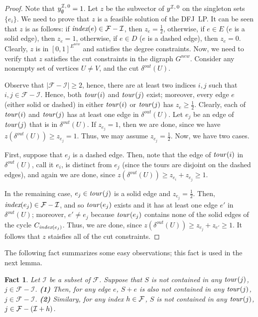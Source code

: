 \documentclass[11pt]{article}
\newtheorem{fact}[theorem]{Fact}
\newcommand{\fracset}{\mathcal{F}}
\newcommand{\sgn}{\mathcal{I}}
\begin{document}
\begin{proof}
Note that $\zvec{\sgn}{0}_{\emptyset}=1$.
Let $z$ be the subvector of $\zvec{\sgn}{0}$
on the singleton sets $\{e_i\}$.
We need to prove that $z$ is a feasible
solution of the DFJ~LP.
It can be seen that $z$ is as follows:
if $\cindex{e}\in\fracset-\sgn$, then $z_e=\frac12$,
otherwise, if $e\in E$ ($e$ is a solid edge), then $z_e=1$,
otherwise, if $e\in D$ ($e$ is a dashed edge), then $z_e=0$.
Clearly, $z$ is in $[0, 1]^{E^{new}}$ and satisfies the degree constraints.
Now, we need to verify that $z$ satisfies the cut constraints
in the digraph $G^{new}$.
Consider any nonempty set of vertices $U\not=V$, and the cut $\delta^{out}(U)$.

Observe that $|\fracset-\sgn| \ge2$, hence, there are at least two indices
$i,j$ such that $i,j\in \fracset-\sgn$.
Hence, both $\textit{tour\/}(i)$ and $\textit{tour\/}(j)$ exist;
moreover, every edge $e$ (either solid or dashed) in either
$\textit{tour\/}(i)$ or $\textit{tour\/}(j)$ has $z_e\ge\frac12$.
Clearly, each of $\textit{tour\/}(i)$ and $\textit{tour\/}(j)$ has
at least one edge in $\delta^{out}(U)$.
Let $e_j$ be an edge of $\textit{tour\/}(j)$ that is in $\delta^{out}(U)$.
If $z_{e_j}=1$, then we are done,
since we have $z(\delta^{out}(U))\ge z_{e_j}=1$.
Thus, we may assume $z_{e_j}=\frac12$.
Now, we have two cases.

First, suppose that $e_j$ is a dashed edge.
Then, note that the edge of $\textit{tour\/}(i)$ in $\delta^{out}(U)$,
call it $e_i$, is distinct from $e_j$
(since the tours are disjoint on the dashed edges),
and again we are done, since $z(\delta^{out}(U))\ge z_{e_i}+z_{e_j}\ge1$.

In the remaining case, $e_j\in\textit{tour\/}(j)$ is a solid edge
and $z_{e_j}=\frac12$.
Then, $\cindex{e_j}\in \fracset-\sgn$, and so 
$\textit{tour\/}(e_j)$
exists and it has at least one edge $e'$ in $\delta^{out}(U)$;
moreover, $e'\not=e_j$ because 
$\textit{tour\/}(e_j)$
contains none of the solid edges of the cycle $C_{\textit{index}(e_j)}$.
Thus, we are done, since $z(\delta^{out}(U))\ge z_{e_j}+z_{e'}\ge1$.
It follows that $z$ staisfies all of the cut constraints.

\end{proof}


The following fact summarizes some easy observations;
this fact is  used in the next lemma.

\begin{fact}
\label{fact:set-intour}
Let $\sgn$ be a subset of $\fracset$.
Suppose that $S$ is not contained in any
$\textit{tour\/}(j)$, $j\in\fracset - \sgn$.
\textbf{(1)}
Then, for any edge $e$,
$S+e$ is also not contained in any
$\textit{tour\/}(j)$, $j\in\fracset - \sgn$.
\textbf{(2)}
Similary, for any index $\indfrac \in\fracset$,
$S$ is not contained in any
$\textit{tour\/}(j)$, $j\in\fracset - (\sgn + \indfrac)$.
\end{fact}
\end{document}
